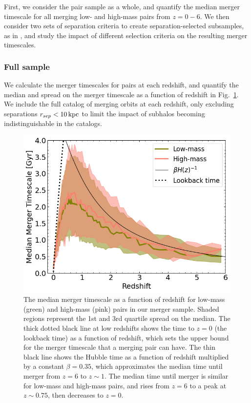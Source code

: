 \documentclass[twocolumn,linenumbers]{aastex631}
\newcommand{\chambe}{\citet{Chamberlain2024}}
\begin{document}
    First, we consider the pair sample as a whole, and quantify the median merger timescale for all merging low- and high-mass pairs from $z=0-6$. 
    We then consider two sets of separation criteria to create separation-selected subsamples, as in \chambe{}, and study the impact of different selection criteria on the resulting merger timescales. 
    

    \subsubsection{Full sample}
        We calculate the merger timescales for pairs at each redshift, and quantify the median and spread on the merger timescale as a function of redshift in Fig.~\ref{fig:timescales}. 
        We include the full catalog of merging orbits at each redshift, only excluding separations $r_{sep}<10\mathrm{\,kpc}$ to limit the impact of subhalos becoming indistinguishable in the \subfind{} catalogs.%

        
        \begin{figure}[tb]
            \centering
            \includegraphics[width=\columnwidth]{plots/bet-on-it/8_timescale.png}
            \caption{The median merger timescale as a function of redshift for low-mass (green) and high-mass (pink) pairs in our merger sample. 
            Shaded regions represent the 1st and 3rd quartile spread on the median. 
            The thick dotted black line at low redshifts shows the time to $z=0$ (the lookback time) as a function of redshift, which sets the upper bound for the merger timescale that a merging pair can have. 
            The thin black line shows the Hubble time as a function of redshift multiplied by a constant $\beta=0.35$, which approximates the median time until merger from $z=6$ to $z\sim1$.
            The median time until merger is similar for low-mass and high-mass pairs, and rises from $z=6$ to a peak at $z\sim0.75$, then decreases to $z=0$.}
            \label{fig:timescales}
        \end{figure}
    
\end{document}
